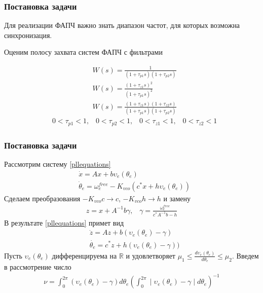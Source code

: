 \documentclass{beamer}
\begin{document}
\begin{frame}
\frametitle{Постановка задачи}
Для реализации ФАПЧ важно знать диапазон частот, для которых возможна синхронизация.
\begin{center}
\Large
Оценим полосу захвата систем ФАПЧ с фильтрами
\end{center}
\begin{equation*}
 \begin{aligned}
&W(s) = \frac{1}{(1+\tau_{p1}s)(1+\tau_{p2}s)}\\[5pt]
&W(s) = \frac{(1+\tau_{z1}s)^2}{(1+\tau_{p1}s)^2}\\[5pt]
&W(s) = \frac{(1+\tau_{z1}s)(1+\tau_{z2}s)}{(1+\tau_{p1}s)(1+\tau_{p2}s)}
 \end{aligned}
\end{equation*}
\begin{equation*}
 \begin{aligned}
&0 < \tau_{p1} < 1 \text{,} \quad 0 < \tau_{p2} <1 \text{,} \quad 0 < \tau_{z1} < 1 \text{,} \quad 0 < \tau_{z2} <1
 \end{aligned}
\end{equation*}
\end{frame}

\begin{frame}
\frametitle{Постановка задачи}
Рассмотрим систему \eqref{pllequations}
 \begin{equation*}
 \begin{aligned}
 &\dot{x} = Ax + b\upsilon_e(\theta_e) \\
 &\dot{\theta}_e = \omega_e^{free} - K_{vco}(c^*x + h\upsilon_e(\theta_e))
 \end{aligned}
\end{equation*}
Сделаем преобразования $-K_{vco}c \rightarrow c$, $-K_{vco}h \rightarrow h$ и замену
 \begin{equation}
 \begin{aligned}
 z = x + A^{-1}b\gamma  \text{,} \quad \gamma = \frac{\omega_e^{free}}{c^*A^{-1}b-h}
 \end{aligned}
\end{equation}
В результате \eqref{pllequations} примет вид
 \begin{equation}
 \begin{aligned}
 &\dot{z} = Az + b(\upsilon_e(\theta_e) - \gamma) \\
 & \dot{\theta_e} = c^*z + h(\upsilon_e(\theta_e) - \gamma))
 \end{aligned}
\end{equation}
Пусть $\upsilon_e(\theta_e)$ дифференцируема на $\mathbb {R}$ и удовлетворяет $\mu_1 \leq \frac{d\upsilon_e(\theta_e)}{d\theta_e} \leq \mu_2$. Введем в рассмотрение число
 \begin{equation}
 \begin{aligned}
\nu = \int_{0}^{2\pi} (\upsilon_e(\theta_e) - \gamma) d\theta_e \left(\int_{0}^{2\pi} \mid \upsilon_e(\theta_e) - \gamma \mid d\theta_e\right)^{-1}
 \end{aligned}
\end{equation}
\end{frame}
\end{document}
